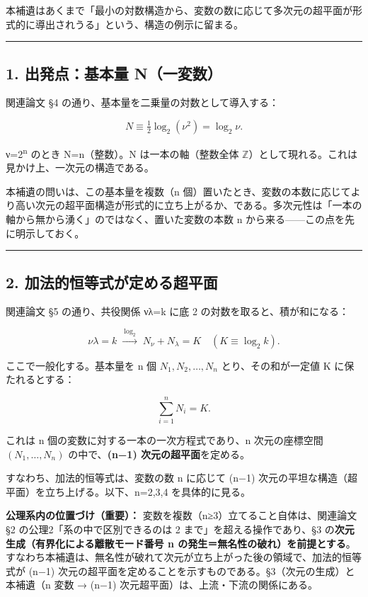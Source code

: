 \documentclass[11pt]{ltjsarticle}
\begin{document}
本補遺はあくまで「最小の対数構造から、変数の数に応じて多次元の超平面が形式的に導出されうる」という、構造の例示に留まる。

\begin{center}\rule{0.5\linewidth}{0.5pt}\end{center}

\subsection{1. 出発点：基本量
N（一変数）}\label{ux51faux767aux70b9ux57faux672cux91cf-nux4e00ux5909ux6570}

関連論文 §4 の通り、基本量を二乗量の対数として導入する：

\[N \equiv \tfrac{1}{2}\log_2(\nu^2) = \log_2\nu .\]

ν=2\textsuperscript{n} のとき N=n（整数）。N は一本の軸（整数全体
$\mathbb{Z}$）として現れる。これは見かけ上、一次元の構造である。

本補遺の問いは、この基本量を複数（n
個）置いたとき、変数の本数に応じてより高い次元の超平面構造が形式的に立ち上がるか、である。多次元性は「一本の軸から無から湧く」のではなく、置いた変数の本数
n から来る------この点を先に明示しておく。

\begin{center}\rule{0.5\linewidth}{0.5pt}\end{center}

\subsection{2.
加法的恒等式が定める超平面}\label{ux52a0ux6cd5ux7684ux6052ux7b49ux5f0fux304cux5b9aux3081ux308bux8d85ux5e73ux9762}

関連論文 §5 の通り、共役関係 νλ=k に底 2 の対数を取ると、積が和になる：

\[\nu\lambda=k \;\xrightarrow{\ \log_2\ }\; N_\nu + N_\lambda = K \quad(K\equiv\log_2 k).\]

ここで一般化する。基本量を n 個 \(N_1, N_2, \dots, N_n\)
とり、その和が一定値 K に保たれるとする：

\[\sum_{i=1}^{n} N_i = K .\]

これは n 個の変数に対する一本の一次方程式であり、n 次元の座標空間
\((N_1,\dots,N_n)\) の中で、\textbf{(n−1) 次元の超平面}を定める。

すなわち、加法的恒等式は、変数の数 n に応じて (n−1)
次元の平坦な構造（超平面）を立ち上げる。以下、n=2,3,4 を具体的に見る。

\textbf{公理系内の位置づけ（重要）：}
変数を複数（n≥3）立てること自体は、関連論文 §2
の公理2「系の中で区別できるのは 2 まで」を超える操作であり、§3
の\textbf{次元生成（有界化による離散モード番号 n
の発生＝無名性の破れ）を前提とする}。すなわち本補遺は、無名性が破れて次元が立ち上がった後の領域で、加法的恒等式が
(n−1)
次元の超平面を定めることを示すものである。§3（次元の生成）と本補遺（n
変数 → (n−1) 次元超平面）は、上流・下流の関係にある。
\end{document}
